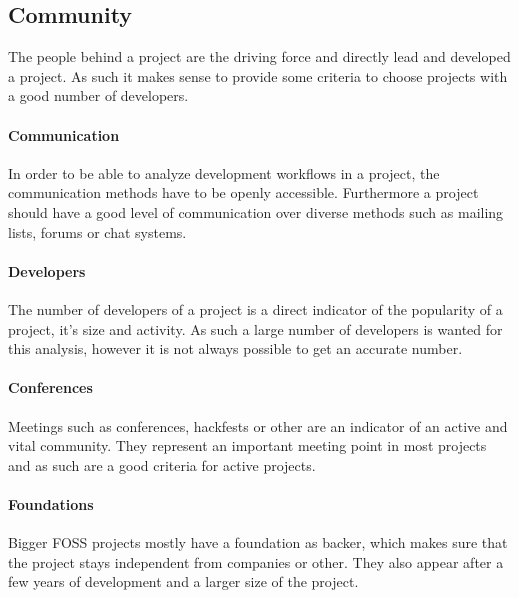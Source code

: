 

\subsection{Community} %

The people behind a project are the driving force and directly lead and
developed a project. As such it makes sense to provide some criteria to choose
projects with a good number of developers.

\paragraph{Communication} %

In order to be able to analyze development workflows in a project, the
communication methods have to be openly accessible. Furthermore a project
should have a good level of communication over diverse methods such as mailing
lists, forums or chat systems.


\paragraph{Developers} %

The number of developers of a project is a direct indicator of the popularity
of a project, it's size and activity. As such a large number of developers is
wanted for this analysis, however it is not always possible to get an accurate
number.


\paragraph{Conferences} %

Meetings such as conferences, hackfests or other are an indicator of an active
and vital community. They represent an important meeting point in most projects
and as such are a good criteria for active projects.


\paragraph{Foundations} %

Bigger \ac{FOSS} projects mostly have a foundation as backer, which makes sure
that the project stays independent from companies or other. They also appear
after a few years of development and a larger size of the project.

